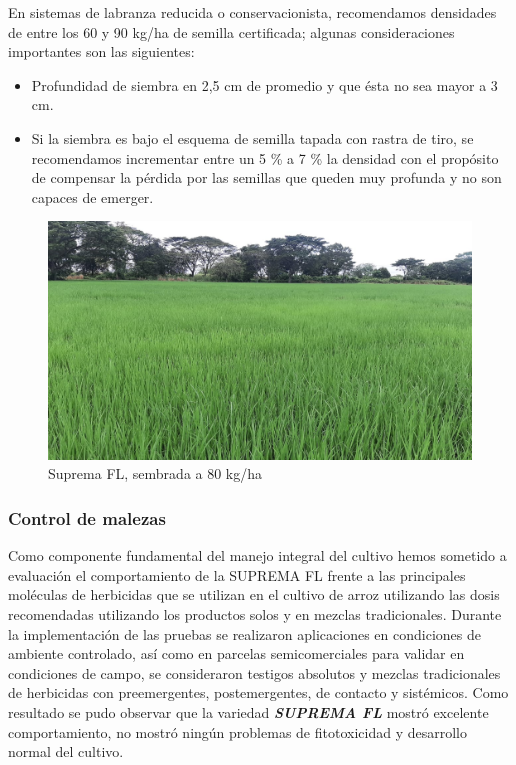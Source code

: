 \documentclass[
  letterpaper,
  DIV=11,
  numbers=noendperiod]{scrartcl}
\begin{document}
En sistemas de labranza reducida o conservacionista, recomendamos
densidades de entre los 60 y 90 kg/ha de semilla certificada; algunas
consideraciones importantes son las siguientes:

\begin{itemize}
\item
  Profundidad de siembra en 2,5 cm de promedio y que ésta no sea mayor a
  3 cm.
\item
  Si la siembra es bajo el esquema de semilla tapada con rastra de tiro,
  se recomendamos incrementar entre un 5 \% a 7 \% la densidad con el
  propósito de compensar la pérdida por las semillas que queden muy
  profunda y no son capaces de emerger.
\end{itemize}

\begin{figure}[H]

{\centering \includegraphics{AP009-5.jpeg}

}

\caption{Suprema FL, sembrada a 80 kg/ha}

\end{figure}%

\subsubsection{\texorpdfstring{\textbf{Control de
malezas}}{Control de malezas}}\label{control-de-malezas}

Como componente fundamental del manejo integral del cultivo hemos
sometido a evaluación el comportamiento de la SUPREMA FL frente a las
principales moléculas de herbicidas que se utilizan en el cultivo de
arroz utilizando las dosis recomendadas utilizando los productos solos y
en mezclas tradicionales. Durante la implementación de las pruebas se
realizaron aplicaciones en condiciones de ambiente controlado, así como
en parcelas semicomerciales para validar en condiciones de campo, se
consideraron testigos absolutos y mezclas tradicionales de herbicidas
con preemergentes, postemergentes, de contacto y sistémicos. Como
resultado se pudo observar que la variedad \textbf{\emph{SUPREMA FL}}
mostró excelente comportamiento, no mostró ningún problemas de
fitotoxicidad y desarrollo normal del cultivo.
\end{document}
